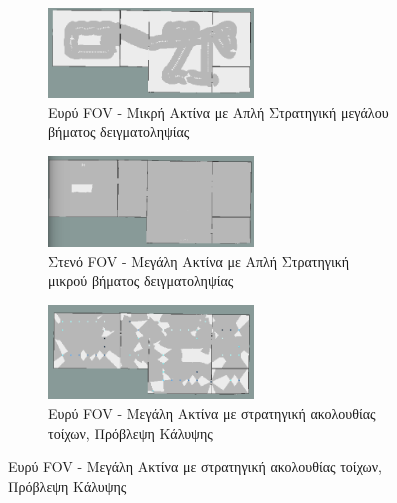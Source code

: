 \begin{figure}[H]
     \centering
     \begin{subfigure}[b]{\textwidth}
         \centering
         \includegraphics[width=0.6\textwidth]{./images/chapter6/rooms_3_simple_large_coverage_wide_short.png}
         \caption{Ευρύ FOV - Μικρή Ακτίνα με Απλή Στρατηγική μεγάλου βήματος δειγματοληψίας}
         \label{fig:rooms_3_simple_large_coverage_wide_short}
     \end{subfigure}
     \begin{subfigure}[b]{\textwidth}
         \centering
         \includegraphics[width=0.6\textwidth]{./images/chapter6/rooms_3_simple_small_coverage_narrow_long.png}
         \caption{Στενό FOV - Μεγάλη Ακτίνα με Απλή Στρατηγική μικρού βήματος δειγματοληψίας}
         \label{fig:rooms_3_simple_small_coverage_narrow_long}
     \end{subfigure}
     \hfill
     \begin{subfigure}[b]{\textwidth}
         \centering
         \includegraphics[width=0.6\textwidth]{./images/chapter6/rooms_3_wall_follow_wide_long.png}
         \caption{Ευρύ FOV - Μεγάλη Ακτίνα με στρατηγική ακολουθίας τοίχων, Πρόβλεψη Κάλυψης}
         \label{fig:rooms_3_wall_follow_wide_long}
     \end{subfigure}
\end{figure}
